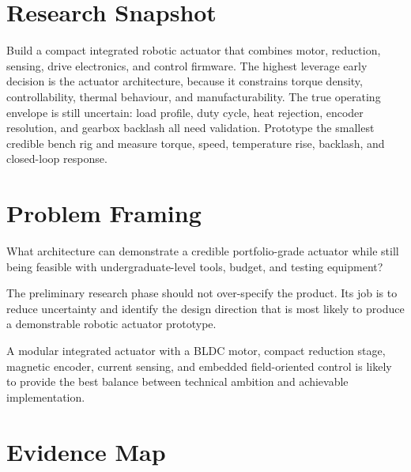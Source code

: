 \documentclass[internal]{../../classes/nervtech-research}
\begin{document}
\maketitle
\tableofcontents
\newpage

\section{Research Snapshot}

\researchsnapshot
  {Build a compact integrated robotic actuator that combines motor, reduction, sensing, drive electronics, and control firmware.}
  {The highest leverage early decision is the actuator architecture, because it constrains torque density, controllability, thermal behaviour, and manufacturability.}
  {The true operating envelope is still uncertain: load profile, duty cycle, heat rejection, encoder resolution, and gearbox backlash all need validation.}
  {Prototype the smallest credible bench rig and measure torque, speed, temperature rise, backlash, and closed-loop response.}

\section{Problem Framing}

\begin{researchquestion}
What architecture can demonstrate a credible portfolio-grade actuator while still being feasible with undergraduate-level tools, budget, and testing equipment?
\end{researchquestion}

The preliminary research phase should not over-specify the product. Its job is to reduce uncertainty and identify the design direction that is most likely to produce a demonstrable robotic actuator prototype.

\begin{hypothesisbox}[Architecture]
A modular integrated actuator with a BLDC motor, compact reduction stage, magnetic encoder, current sensing, and embedded field-oriented control is likely to provide the best balance between technical ambition and achievable implementation.
\end{hypothesisbox}

\section{Evidence Map}

\begin{evidencetable}
\end{evidencetable}
\end{document}
